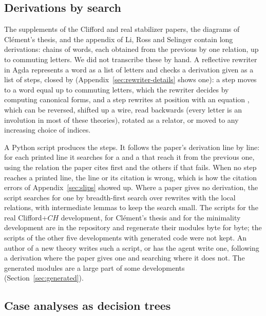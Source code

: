 \subsection{Derivations by search}\label{sec:search}

The supplements of the Clifford and real stabilizer papers, the
diagrams of Cl\'ement's thesis, and the appendix of Li, Ross and
Selinger contain long derivations: chains of words, each obtained from
the previous by one relation, up to commuting letters. We did not
transcribe these by hand. A reflective rewriter in Agda represents a
word as a list of letters and checks a derivation given as a list of
steps, closed by  (Appendix~\ref{sec:rewriter-details} shows
one): a  step moves to a word equal up to commuting letters,
which the rewriter decides by computing canonical forms, and a
 step rewrites at position  with an equation
, which can be reversed, shifted up a wire, read backwards
(every letter is an involution in most of these theories), rotated as
a relator, or moved to any increasing choice of indices.

A Python script produces the steps. It follows the paper's derivation
line by line: for each printed line it searches for a  and a
 that reach it from the previous one, using the relation the
paper cites first and the others if that fails. When no step reaches a
printed line, the line or its citation is wrong, which is how the
citation errors of Appendix~\ref{sec:slips} showed up. Where a paper
gives no derivation, the script searches for one by breadth-first
search over rewrites with the local relations, with intermediate
lemmas to keep the search small. The scripts for the real
Clifford+$CH$ development, for Cl\'ement's thesis and for the
minimality development are in the repository and regenerate their
modules byte for byte; the scripts of the other five developments
with generated code were not kept. An
author of a new theory writes such a script, or has the agent write
one, following a derivation where the paper gives one and searching
where it does not. The generated modules are a large part of some
developments (Section~\ref{sec:generated}).

\subsection{Case analyses as decision trees}\label{sec:trees}

